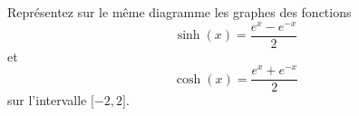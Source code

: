 \begin{exercice}\label{exoMatlab0011}

	Représentez sur le même diagramme les graphes des fonctions
	\begin{equation*}
		\sinh(x)=\frac{  e^{x}- e^{-x} }{ 2 }
	\end{equation*}
	et
	\begin{equation*}
		\cosh(x)=\frac{  e^{x}+ e^{-x} }{ 2 }
	\end{equation*}
	sur l'intervalle $\mathopen[ -2 , 2 \mathclose]$.

\end{exercice}
